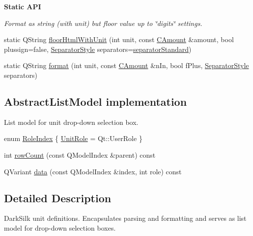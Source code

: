 \begin{Indent}{\bf Static A\+P\+I}
\begin{DoxyCompactItemize}
\begin{DoxyCompactList}\small\item\em Format as string (with unit) but floor value up to \char`\"{}digits\char`\"{} settings. \end{DoxyCompactList}\item 
static Q\+String \hyperlink{class_dark_silk_units_abe3d1ba8e88272a462f9d69943d01a85}{floor\+Html\+With\+Unit} (int unit, const \hyperlink{amount_8h_a4eaf3a5239714d8c45b851527f7cb564}{C\+Amount} \&amount, bool plussign=false, \hyperlink{class_dark_silk_units_a492e7b4a5708e04f3a97609c07b733b9}{Separator\+Style} separators=\hyperlink{class_dark_silk_units_a492e7b4a5708e04f3a97609c07b733b9a9cb3f6f5405413dc7960959c15cb5d6c}{separator\+Standard})
\item 
static Q\+String \hyperlink{class_dark_silk_units_acd1231dbc79f196fcb65fc4469b07a4a}{format} (int unit, const \hyperlink{amount_8h_a4eaf3a5239714d8c45b851527f7cb564}{C\+Amount} \&n\+In, bool f\+Plus, \hyperlink{class_dark_silk_units_a492e7b4a5708e04f3a97609c07b733b9}{Separator\+Style} separators)
\end{DoxyCompactItemize}
\end{Indent}
\subsection*{Abstract\+List\+Model implementation}
\label{_amgrp2e845e8604997c2ca3724f5375e55564}%
 List model for unit drop-\/down selection box. \begin{DoxyCompactItemize}
\item 
enum \hyperlink{class_dark_silk_units_a39329690c784008fa8abd01e8bdde9b3}{Role\+Index} \{ \hyperlink{class_dark_silk_units_a39329690c784008fa8abd01e8bdde9b3ac0da3c9b33518a08612bb0ca9f57a396}{Unit\+Role} = Qt\+:\+:User\+Role
 \}
\item 
int \hyperlink{class_dark_silk_units_a7bd7e537a9b0411b5a02c9c5a8bcbe22}{row\+Count} (const Q\+Model\+Index \&parent) const 
\item 
Q\+Variant \hyperlink{class_dark_silk_units_aa6730b7a4179a579c1ac00f25766343f}{data} (const Q\+Model\+Index \&index, int role) const 
\end{DoxyCompactItemize}


\subsection{Detailed Description}
Dark\+Silk unit definitions. Encapsulates parsing and formatting and serves as list model for drop-\/down selection boxes. 

